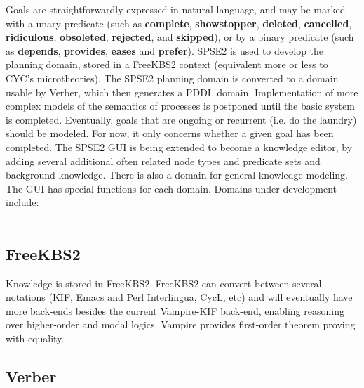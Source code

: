 \documentclass[letterpaper]{article}
\begin{document}
\noindent Goals are straightforwardly expressed in natural language,
and may be marked with a unary predicate (such as {\bf complete}, {\bf
  showstopper}, {\bf deleted}, {\bf cancelled}, {\bf ridiculous}, {\bf
  obsoleted}, {\bf rejected}, and {\bf skipped}), or by a binary
predicate (such as {\bf depends}, {\bf provides}, {\bf eases} and {\bf
  prefer}).  SPSE2 is used to develop the planning domain, stored in a
FreeKBS2 context (equivalent more or less to CYC's microtheories).
The SPSE2 planning domain is converted to a domain usable by Verber,
which then generates a PDDL domain.  Implementation of more complex
models of the semantics of processes is postponed until the basic
system is completed.  Eventually, goals that are ongoing or recurrent
(i.e. do the laundry) should be modeled.  For now, it only concerns
whether a given goal has been completed.  The SPSE2 GUI is being
extended to become a knowledge editor, by adding several additional
often related node types and predicate sets and background knowledge.
There is also a domain for general knowledge modeling.  The GUI has
special functions for each domain.  Domains under development
include:\\

\\

\subsection{FreeKBS2}

Knowledge is stored in FreeKBS2.  FreeKBS2 can convert between several
notations (KIF, Emacs and Perl Interlingua, CycL, etc) and will
eventually have more back-ends besides the current Vampire-KIF
back-end, enabling reasoning over higher-order and modal logics.
Vampire provides first-order theorem proving with equality.

\subsection{Verber}
\end{document}
